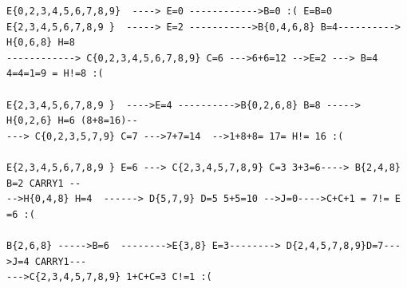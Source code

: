 \documentclass[a4paper,8pt]{article}
\begin{document}
\begin{verbatim}
E{0,2,3,4,5,6,7,8,9}  ----> E=0 ------------>B=0 :( E=B=0 
E{2,3,4,5,6,7,8,9 }  -----> E=2 ----------->B{0,4,6,8} B=4----------> H{0,6,8} H=8
------------> C{0,2,3,4,5,6,7,8,9} C=6 --->6+6=12 -->E=2 ---> B=4 4=4=1=9 = H!=8 :(

E{2,3,4,5,6,7,8,9 }  ---->E=4 ---------->B{0,2,6,8} B=8 -----> H{0,2,6} H=6 (8+8=16)--
---> C{0,2,3,5,7,9} C=7 --->7+7=14  -->1+8+8= 17= H!= 16 :(

E{2,3,4,5,6,7,8,9 } E=6 ---> C{2,3,4,5,7,8,9} C=3 3+3=6----> B{2,4,8} B=2 CARRY1 --
-->H{0,4,8} H=4  ------> D{5,7,9} D=5 5+5=10 -->J=0---->C+C+1 = 7!= E =6 :(

B{2,6,8} ----->B=6  -------->E{3,8} E=3--------> D{2,4,5,7,8,9}D=7--->J=4 CARRY1---
--->C{2,3,4,5,7,8,9} 1+C+C=3 C!=1 :(
\end{verbatim}
\end{document}
